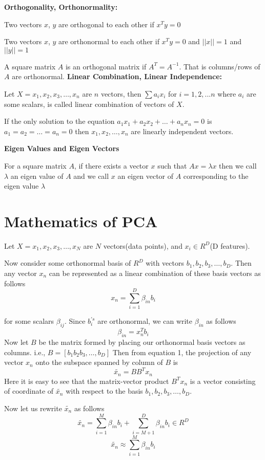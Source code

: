 \documentclass[11pt]{article}
\begin{document}
\noindent
\textbf{Orthogonality, Orthonormality:}

Two vectors $x$, $y$ are orthogonal to each other if $x^Ty=0$ 

Two vectors $x$, $y$ are orthonormal to each other if $x^Ty=0$ and $||x||=1$ and $||y||=1$

A square matrix $A$ is an orthogonal matrix if $A^T = A^{-1}$. That is columns/rows of $A$ are orthonormal.
\noindent
\textbf{Linear Combination, Linear Independence:}

Let $X = {x_1, x_2, x_3, \dots, x_n}$ are $n$ vectors, then $\sum a_ix_i$ for $i=1,2,...n$ where $a_i$ are some scalars, is called linear combination of vectors of $X$.

If the only solution to the equation $a_1x_1+a_2x_2+\dots+a_nx_n=0$ is $a_1=a_2=\dots=a_n=0$ then $x_1, x_2, \dots, x_n$ are linearly independent vectors. 

\noindent
\textbf{Eigen Values and Eigen Vectors}

For a square matrix $A$, if there exists a vector $x$ such that $Ax = \lambda x$ then we call $\lambda$ an eigen value of $A$ and we call $x$ an eigen vector of $A$ corresponding to the eigen value $\lambda$ 
\section*{Mathematics of PCA}
Let $X = {x_1, x_2, x_3, \dots, x_N}$ are $N$ vectors(data points), and $x_i \in R^D$(D features).

Now consider some orthonormal basis of $R^D$ with vectors $b_1, b_2, b_3, \dots, b_D$. Then any vector $x_n$ can be represented as a linear combination of these basis vectors as follows
\begin{equation}
    x_n = \sum_{i=1}^{D} \beta_{in}b_i
\end{equation}

for some scalars $\beta_{ij}$. Since $b_i^{'s}$ are orthonormal, we can write $\beta_{in}$ as follows 
$$\beta_{in} = x_n^Tb_i$$
Now let $B$ be the matrix formed by placing our orthonormal basis vectors as columns. i.e., $B = [b_1 b_2 b_3, \dots, b_D]$
Then from equation 1, the projection of any vector $x_n$ onto the subspace spanned by column of $B$ is 
$$\tilde{x_n} = BB^Tx_n$$
Here it is easy to see that the matrix-vector product $B^Tx_n$ is a vector consisting of coordinate of $\tilde{x_n}$ with respect to the basis $b_1, b_2, b_3, \dots, b_D$.

Now let us rewrite $\tilde{x_n}$ as follows
$$\tilde{x_n} = \sum_{i=1}^{M}\beta_{in}b_i + \sum_{i=M+1}^{D}\beta_{in}b_i \in R^D$$
\begin{equation}
    \tilde{x_n} \approx \sum_{i=1}^{M}\beta_{in}b_i    
\end{equation}
\end{document}

